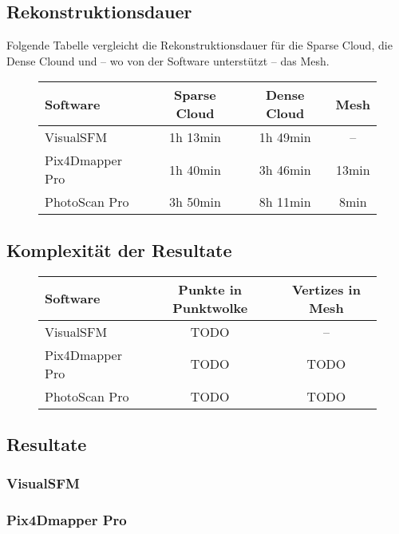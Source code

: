 \subsection{Rekonstruktionsdauer}

Folgende Tabelle vergleicht die Rekonstruktionsdauer für die Sparse Cloud, die
Dense Clound und – wo von der Software unterstützt – das Mesh.

\begin{figure}[H]
	\begin{tabularx}{\textwidth}[H]{Xccc}
		\toprule
		\textbf{Software} & \textbf{Sparse Cloud} & \textbf{Dense Cloud} & \textbf{Mesh} \\
		\midrule
		VisualSFM & 1h 13min & 1h 49min & – \\
		Pix4Dmapper Pro & 1h 40min & 3h 46min & 13min \\
		PhotoScan Pro & 3h 50min & 8h 11min & 8min \\
		\bottomrule
	\end{tabularx}
\end{figure}

\subsection{Komplexität der Resultate}

\begin{figure}[H]
	\begin{tabularx}{\textwidth}[H]{Xcc}
		\toprule
		\textbf{Software} & \textbf{Punkte in Punktwolke} & \textbf{Vertizes in Mesh} \\
		\midrule
		VisualSFM & TODO & – \\
		Pix4Dmapper Pro & TODO & TODO \\
		PhotoScan Pro & TODO & TODO \\
		\bottomrule
	\end{tabularx}
\end{figure}

\newpage

\subsection{Resultate}

\subsubsection{VisualSFM}
\subsubsection{Pix4Dmapper Pro}

